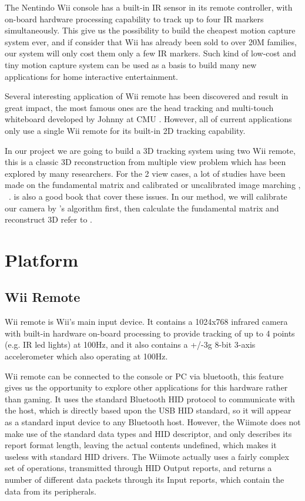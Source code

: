 \documentclass[10pt,twocolumn,letterpaper]{article}
\begin{document}
The Nentindo Wii console has a built-in IR sensor in its remote
controller, with on-board hardware processing capability to track
up to four IR markers simultaneously. This give us the possibility
to build the cheapest motion capture system ever, 
and if consider that Wii has
already been sold to over 20M families, 
our system will only cost them only a few IR markers. 
Such kind of low-cost and tiny motion capture system can be used as a basis 
to build many new applications for home interactive entertainment.

Several interesting application of Wii remote has been discovered 
and result in great impact, the most famous ones are the head tracking
and multi-touch whiteboard developed by Johnny at CMU\cite{JohnnyVR} \cite{JohnnyTouch}.
However, all of current applications only use a single Wii remote for 
its built-in 2D tracking capability.

In our project we are going to build a 3D tracking system using two Wii
remote, this is a classic 3D reconstruction from multiple view problem 
which has been explored by many researchers. For the 2 view cases, 
a lot of studies have been made on the fundamental 
matrix and calibrated or uncalibrated image marching
\cite{luong95},\cite{Higgins87} \cite{Zhang95}~\cite{Hartley95}. 
\cite{Hartley03} is also a good book that cover these issues. 
In our method, we will calibrate our camera by \cite{Zhang00}'s 
algorithm first, then calculate the fundamental matrix 
and reconstruct 3D refer to \cite{Faugeras92}.


\section{Platform}

\subsection{Wii Remote}
Wii remote is Wii's main input device. It contains a 1024x768 infrared camera with 
built-in hardware on-board processing to provide 
tracking of up to 4 points (e.g. IR led lights) at 100Hz, 
and it also contains a +/-3g 8-bit 3-axis accelerometer 
which also operating at 100Hz.

Wii remote can be connected to the console 
or PC via bluetooth, this feature gives us the opportunity 
to explore other applications for this hardware rather 
than gaming. 
It uses the standard Bluetooth HID protocol to 
communicate with the host, which is directly based upon 
the USB HID standard, so it will appear as a 
standard input device to any Bluetooth host. 
However, the Wiimote does not make use of the standard 
data types and HID descriptor, and only describes 
its report format length, leaving the actual contents undefined, 
which makes it useless with standard HID drivers. 
The Wiimote actually uses a fairly complex set of operations, 
transmitted through HID Output reports, and returns a number 
of different data packets through its Input reports, 
which contain the data from its peripherals.
\end{document}
